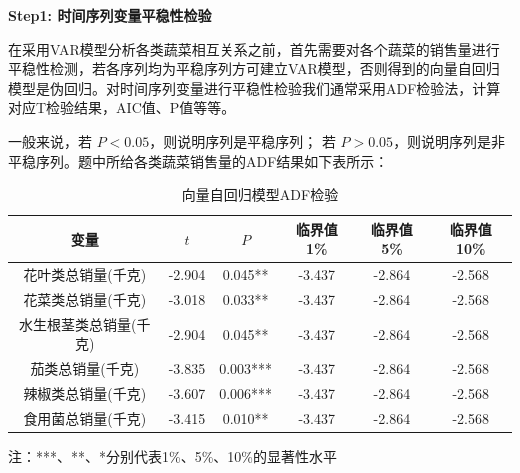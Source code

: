 \documentclass{my_paper}
\begin{document}
\begin{itemize}
\textbf{Step1: 时间序列变量平稳性检验}\par
在采用VAR模型分析各类蔬菜相互关系之前，首先需要对各个蔬菜的销售量进行平稳性检测，若各序列均为平稳序列方可建立VAR模型，否则得到的向量自回归模型是伪回归。对时间序列变量进行平稳性检验我们通常采用ADF检验法，计算对应T检验结果，AIC值、P值等等。\par
一般来说，若 $P<0.05$，则说明序列是平稳序列； 若 $P>0.05$，则说明序列是非平稳序列。题中所给各类蔬菜销售量的ADF结果如下表所示：
\begin{table}[H]
    \centering
     \caption{向量自回归模型ADF检验}
    \begin{tabular}{cccccc}
    \toprule
        变量 & $t$ & $P$ & 临界值1\% &临界值5\%  & 临界值10\% \\ 
        \midrule
        花叶类总销量(千克) & -2.904 & 0.045** & -3.437 & -2.864 & -2.568 \\ 
        花菜类总销量(千克) & -3.018 & 0.033** & -3.437 & -2.864 & -2.568 \\ 
        水生根茎类总销量(千克) & -2.904 & 0.045** & -3.437 & -2.864 & -2.568 \\ 
        茄类总销量(千克) & -3.835 & 0.003*** & -3.437 & -2.864 & -2.568 \\ 
        辣椒类总销量(千克) & -3.607 & 0.006*** & -3.437 & -2.864 & -2.568 \\ 
        食用菌总销量(千克) & -3.415 & 0.010** & -3.437 & -2.864 & -2.568 \\ 
        \bottomrule
    \end{tabular}
    \label{ADF检验}
\end{table}
\vspace{-0.5cm}
 注：***、**、*分别代表1\%、5\%、10\%的显著性水平


\end{itemize}
\end{document}
